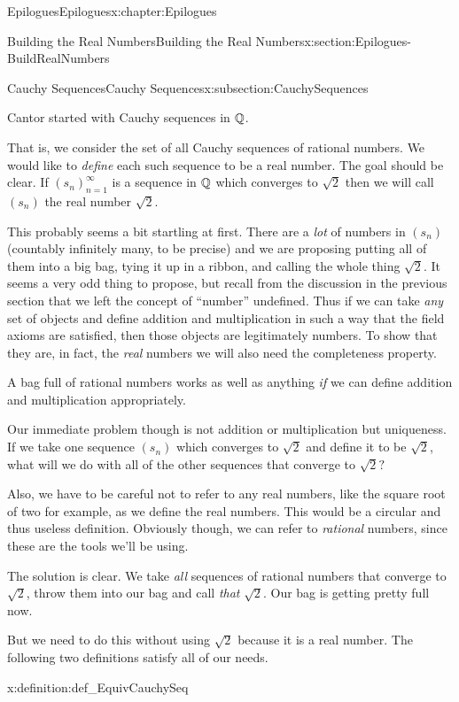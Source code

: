 \begin{chapterptx}{Epilogues}{}{Epilogues}{}{}{x:chapter:Epilogues}
\begin{sectionptx}{Building the Real Numbers}{}{Building the Real Numbers}{}{}{x:section:Epilogues-BuildRealNumbers}
\begin{subsectionptx}{Cauchy Sequences}{}{Cauchy Sequences}{}{}{x:subsection:CauchySequences}
			\par
			Cantor started with Cauchy sequences in \(\mathbb {Q}\).%
			\par
			That is, we consider the set of all Cauchy sequences of rational numbers. We would like to \emph{define} each such sequence to be a real number. The goal should be clear. If \(\left(s_n\right)_{n=1}^\infty\) is a sequence in \(\mathbb {Q}\) which converges to \(\sqrt{2}\) then we will call \(\left(s_n\right)\) the real number \(\sqrt{2}\).%
			\par
			This probably seems a bit startling at first. There are a \emph{lot} of numbers in \(\left(s_n\right)\) (countably infinitely many, to be precise) and we are proposing putting all of them into a big bag, tying it up in a ribbon, and calling the whole thing \(\sqrt{2}\). It seems a very odd thing to propose, but recall from the discussion in the previous section that we left the concept of ``number'' undefined. Thus if we can take \emph{any} set of objects and define addition and multiplication in such a way that the field axioms are satisfied, then those objects are legitimately numbers. To show that they are, in fact, the \emph{real} numbers we will also need the completeness property.%
			\par
			A bag full of rational numbers works as well as anything \emph{if} we can define addition and multiplication appropriately.%
			\par
			Our immediate problem though is not addition or multiplication but uniqueness. If we take one sequence \(\left(s_n\right)\) which converges to \(\sqrt{2}\) and define it to be \(\sqrt{2}\), what will we do with all of the other sequences that converge to \(\sqrt{2}?\)%
			\par
			Also, we have to be careful not to refer to any real numbers, like the square root of two for example, as we define the real numbers. This would be a circular \textemdash{} and thus useless \textemdash{} definition. Obviously though, we can refer to \emph{rational} numbers, since these are the tools we'll be using.%
			\par
			The solution is clear. We take \emph{all} sequences of rational numbers that converge to \(\sqrt{2}\), throw them into our bag and call \emph{that} \(\sqrt{2}\). Our bag is getting pretty full now.%
			\par
			But we need to do this without using \(\sqrt{2}\) because it is a real number. The following two definitions satisfy all of our needs.%
			\begin{definition}{}{x:definition:def_EquivCauchySeq}%

\end{definition}
\end{subsectionptx}
\end{sectionptx}
\end{chapterptx}
